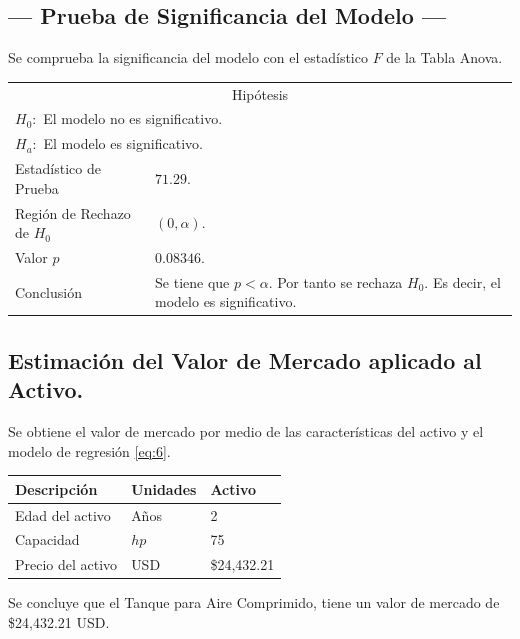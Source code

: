 \subsection{\centering --- Prueba de Significancia del Modelo ---} %
Se comprueba la significancia del modelo con el estadístico \(F\) de la Tabla Anova.
\begin{center}
  \begin{tabular}{|l|p{6cm}|}
    \cline{1-2}
    \multicolumn{2}{|c|}{Hipótesis}\\ \cline{1-2}
    \multicolumn{2}{|l|}{\(H_0:\) El modelo no es significativo.} \\ 
    \multicolumn{2}{|l|}{\(H_a:\) El modelo es significativo.} \\ \cline{1-2}
    Estadístico de Prueba & \(71.29\).\\ \cline{1-2} 
		Región de Rechazo de \(H_0\) & \((0, \alpha )\).\\ \cline{1-2} 
    Valor \(p\) & \(0.08346\).\\ \cline{1-2} 
    Conclusión & Se tiene que \(p<\alpha\). \newline 
		Por tanto se rechaza \(H_0\). \newline 
		Es decir, el modelo es significativo.\\ \cline{1-2} 
  \end{tabular}
\end{center} 

\subsection{\centering Estimación del Valor de Mercado aplicado al Activo.} %
Se obtiene el valor de mercado por medio de las características del activo y el modelo de regresión \eqref{eq:6}.
\begin{center}
  \begin{tabular}{|l|l|l|}
    \hline 
		Descripción   & Unidades  & Activo \\ \hline 
    Edad del activo    & Años      & 2      \\ \hline 
		Capacidad  & \(hp\) & 75   \\ \hline 
		Precio del activo   & USD       & \$24,432.21    \\ \hline 
  \end{tabular}
\end{center} 
Se concluye que el Tanque para Aire Comprimido, tiene un valor de mercado de 
\$24,432.21 USD.


